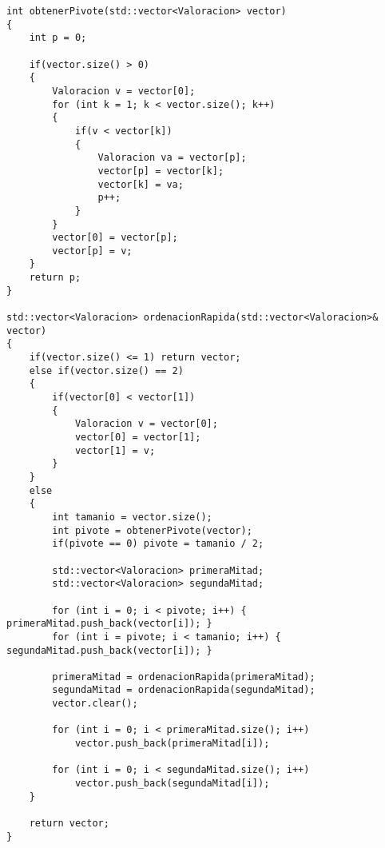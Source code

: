 \lstset{language=C++, texcl=true}
\begin{lstlisting}[frame=single]
int obtenerPivote(std::vector<Valoracion> vector)
{
    int p = 0;
    
    if(vector.size() > 0)
    {
        Valoracion v = vector[0];
        for (int k = 1; k < vector.size(); k++)
        {
            if(v < vector[k])
            {
                Valoracion va = vector[p];
                vector[p] = vector[k];
                vector[k] = va;
                p++;
            }
        }
        vector[0] = vector[p];
        vector[p] = v;
    }
    return p;
}

std::vector<Valoracion> ordenacionRapida(std::vector<Valoracion>& vector)
{
    if(vector.size() <= 1) return vector;
    else if(vector.size() == 2)
    {
        if(vector[0] < vector[1])
        {
            Valoracion v = vector[0];
            vector[0] = vector[1];
            vector[1] = v;
        }
    }
    else
    {
        int tamanio = vector.size();
        int pivote = obtenerPivote(vector);
        if(pivote == 0) pivote = tamanio / 2;
        
        std::vector<Valoracion> primeraMitad;
        std::vector<Valoracion> segundaMitad;
        
        for (int i = 0; i < pivote; i++) { primeraMitad.push_back(vector[i]); }
        for (int i = pivote; i < tamanio; i++) { segundaMitad.push_back(vector[i]); }
        
        primeraMitad = ordenacionRapida(primeraMitad);
        segundaMitad = ordenacionRapida(segundaMitad);
        vector.clear();
        
        for (int i = 0; i < primeraMitad.size(); i++)
            vector.push_back(primeraMitad[i]);
        
        for (int i = 0; i < segundaMitad.size(); i++)
            vector.push_back(segundaMitad[i]);
    }
    
    return vector;
}
\end{lstlisting}
